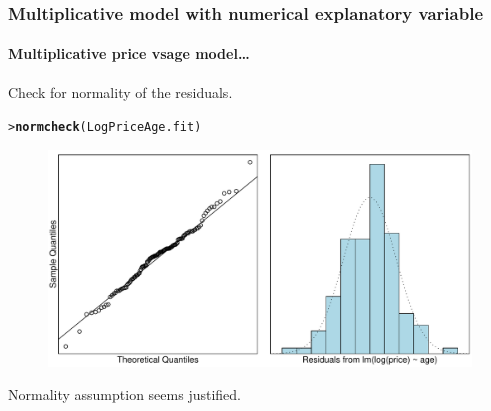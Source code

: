 \documentclass{beamer}\usepackage[]{graphicx}\usepackage[]{xcolor}
\makeatletter
\newcommand{\hlstd}[1]{\textcolor[rgb]{0.345,0.345,0.345}{#1}}%
\newcommand{\hlkwd}[1]{\textcolor[rgb]{0.737,0.353,0.396}{\textbf{#1}}}%
\newenvironment{kframe}{%
 \def\at@end@of@kframe{}%
 \ifinner\ifhmode%
  \def\at@end@of@kframe{\end{minipage}}%
  \begin{minipage}{\columnwidth}%
 \fi\fi%
 \def\FrameCommand##1{\hskip\@totalleftmargin \hskip-\fboxsep
 \colorbox{shadecolor}{##1}\hskip-\fboxsep
     \hskip-\linewidth \hskip-\@totalleftmargin \hskip\columnwidth}%
 \MakeFramed {\advance\hsize-\width
   \@totalleftmargin\z@ \linewidth\hsize
   \@setminipage}}%
 {\par\unskip\endMakeFramed%
 \at@end@of@kframe}
\newenvironment{knitrout}{}{} %
\makeatother
\begin{document}
\begin{frame}[fragile]
\frametitle{Multiplicative model with numerical explanatory variable}
\framesubtitle{Multiplicative price vsage model\ldots }
Check for normality of the residuals.
\begin{knitrout}\scriptsize
{}\color{fgcolor}\begin{kframe}
\begin{alltt}
\hlstd{> }\hlkwd{normcheck}\hlstd{(LogPriceAge.fit)}
\end{alltt}
\end{kframe}
\end{knitrout}



\begin{figure}
  \centering
  \includegraphics[scale=0.5]{figure/RC-H06-031}
\end{figure}

Normality assumption seems justified.
\end{frame}
\end{document}
